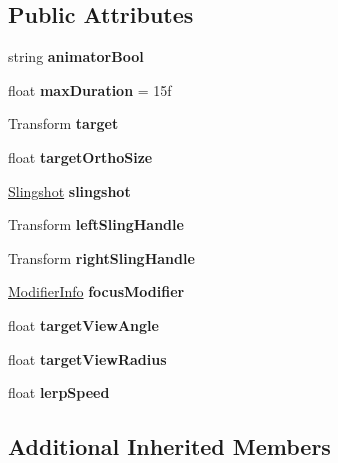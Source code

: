 \subsection*{Public Attributes}
\begin{DoxyCompactItemize}
\item 
\hypertarget{class_focus_a4b492f7d26063fc082756c7c46958944}{}\label{class_focus_a4b492f7d26063fc082756c7c46958944} 
string {\bfseries animator\+Bool}
\item 
\hypertarget{class_focus_a975bc7b52fe72cc7236cc7074417ccfd}{}\label{class_focus_a975bc7b52fe72cc7236cc7074417ccfd} 
float {\bfseries max\+Duration} = 15f
\item 
\hypertarget{class_focus_a6fbcdfca56bdee21102edf139259080e}{}\label{class_focus_a6fbcdfca56bdee21102edf139259080e} 
Transform {\bfseries target}
\item 
\hypertarget{class_focus_a01be8fddc7e6a68cce6ce14cbce9ee4d}{}\label{class_focus_a01be8fddc7e6a68cce6ce14cbce9ee4d} 
float {\bfseries target\+Ortho\+Size}
\item 
\hypertarget{class_focus_aec8ebf92234333f33b8f19ba564dc419}{}\label{class_focus_aec8ebf92234333f33b8f19ba564dc419} 
\hyperlink{class_slingshot}{Slingshot} {\bfseries slingshot}
\item 
\hypertarget{class_focus_a393cb07caebdffab1516cdc16c0b979c}{}\label{class_focus_a393cb07caebdffab1516cdc16c0b979c} 
Transform {\bfseries left\+Sling\+Handle}
\item 
\hypertarget{class_focus_a37594881ba505215fa10b2ee833b1146}{}\label{class_focus_a37594881ba505215fa10b2ee833b1146} 
Transform {\bfseries right\+Sling\+Handle}
\item 
\hypertarget{class_focus_acb6140d7aa3a2a8fd5166a3f8637ca96}{}\label{class_focus_acb6140d7aa3a2a8fd5166a3f8637ca96} 
\hyperlink{struct_modifier_info}{Modifier\+Info} {\bfseries focus\+Modifier}
\item 
\hypertarget{class_focus_aa44c68e9dad6332d2e5460dc4d0554a0}{}\label{class_focus_aa44c68e9dad6332d2e5460dc4d0554a0} 
float {\bfseries target\+View\+Angle}
\item 
\hypertarget{class_focus_a710fda41d9989c97c074b13f43e23ae7}{}\label{class_focus_a710fda41d9989c97c074b13f43e23ae7} 
float {\bfseries target\+View\+Radius}
\item 
\hypertarget{class_focus_ae8beb5d31eaea81208a8b431933ee6c0}{}\label{class_focus_ae8beb5d31eaea81208a8b431933ee6c0} 
float {\bfseries lerp\+Speed}
\end{DoxyCompactItemize}
\subsection*{Additional Inherited Members}


